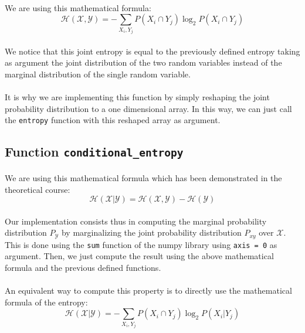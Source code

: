\documentclass[a4paper, 11pt, oneside]{article}
\begin{document}
\paragraph{}We are using this mathematical formula: 
$$ \mathcal{H}(\mathcal{X}, \mathcal{Y}) = - \sum_{X_i, Y_j} P(X_i \cap Y_j) \log_2{P(X_i \cap Y_j)} $$

\paragraph{}We notice that this joint entropy is equal to the previously defined entropy taking as argument the joint distribution of the two random variables instead of the marginal distribution of the single random variable.

\paragraph{}It is why we are implementing this function by simply reshaping the joint probability distribution to a one dimensional array. In this way, we can just call the \texttt{entropy} function with this reshaped array as argument.

\subsection{Function \texttt{conditional\_entropy}}

\paragraph{}We are using this mathematical formula which has been demonstrated in the theoretical course:
$$ \mathcal{H}(\mathcal{X} | \mathcal{Y}) = \mathcal{H}(\mathcal{X} , \mathcal{Y}) - \mathcal{H}(\mathcal{Y}) $$

\paragraph{}Our implementation consists thus in computing the marginal probability distribution $P_\mathcal{Y}$ by marginalizing the joint probability distribution $P_{xy}$ over $\mathcal{X}$. This is done using the \texttt{sum} function of the numpy library using \texttt{axis = 0} as argument. Then, we just compute the result using the above mathematical formula and the previous defined functions.

\paragraph{}An equivalent way to compute this property is to directly use the mathematical formula of the entropy:
$$ \mathcal{H}(\mathcal{X} | \mathcal{Y}) = - \sum_{X_i, Y_j} P(X_i \cap Y_j) \log_2{P(X_i | Y_j)} $$
\end{document}
